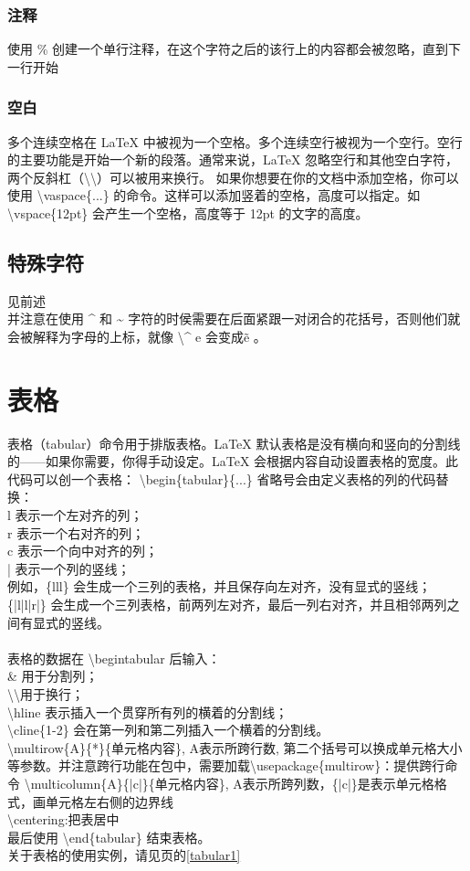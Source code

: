 \documentclass{article}
\begin{document}
\subsubsection{注释}
使用 \% 创建一个单行注释，在这个字符之后的该行上的内容都会被忽略，直到下一行开始
\subsubsection{空白}
多个连续空格在 LaTeX 中被视为一个空格。多个连续空行被视为一个空行。空行的主要功能是开始一个新的段落。通常来说，LaTeX 忽略空行和其他空白字符，两个反斜杠（\textbackslash \textbackslash ）可以被用来换行。
如果你想要在你的文档中添加空格，你可以使用 \textbackslash vaspace\{...\} 的命令。这样可以添加竖着的空格，高度可以指定。如 \textbackslash vspace\{12pt\} 会产生一个空格，高度等于 12pt 的文字的高度。
\subsection{特殊字符}
见前述\\
并注意在使用 \^{} 和 \~{} 字符的时侯需要在后面紧跟一对闭合的花括号，否则他们就会被解释为字母的上标，就像 \textbackslash \^{} e 会变成\~e 。

\section{表格}
表格（tabular）命令用于排版表格。LaTeX 默认表格是没有横向和竖向的分割线的——如果你需要，你得手动设定。LaTeX 会根据内容自动设置表格的宽度。此代码可以创一个表格：
\textbackslash begin\{tabular\}\{...\}
省略号会由定义表格的列的代码替换：\\
l 表示一个左对齐的列；\\
r 表示一个右对齐的列；\\
c 表示一个向中对齐的列；\\
| 表示一个列的竖线；\\
例如，\{lll\} 会生成一个三列的表格，并且保存向左对齐，没有显式的竖线；\{|l|l|r|\} 会生成一个三列表格，前两列左对齐，最后一列右对齐，并且相邻两列之间有显式的竖线。\\\\
表格的数据在 \textbackslash begin{tabular} 后输入：\\
\& 用于分割列；\\
\textbackslash \textbackslash  用于换行；\\
\textbackslash hline 表示插入一个贯穿所有列的横着的分割线；\\
\textbackslash cline\{1-2\} 会在第一列和第二列插入一个横着的分割线。\\
\textbackslash multirow\{A\}\{*\}\{单元格内容\}, A表示所跨行数, 第二个括号可以换成单元格大小等参数。并注意跨行功能在包中，需要加载\textbackslash usepackage\{multirow\}：提供跨行命令
\textbackslash multicolumn\{A\}\{|c|\}\{单元格内容\}, A表示所跨列数，\{|c|\}是表示单元格格式，画单元格左右侧的边界线\\
\textbackslash centering:把表居中\\
最后使用 \textbackslash end\{tabular\} 结束表格。\\
关于表格的使用实例，请见\pageref{tabular1}页的\ref{tabular1}
\\
\end{document}
